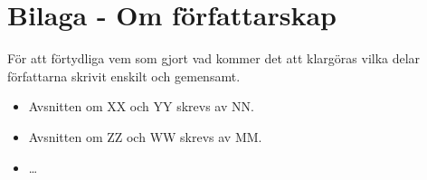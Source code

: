 \section{Bilaga - Om författarskap}
För att förtydliga vem som gjort vad kommer det att klargöras vilka delar
författarna skrivit enskilt och gemensamt.

\begin{itemize}
  \item Avsnitten om XX och YY skrevs av NN.
  \item Avsnitten om ZZ och WW skrevs av MM.
  \item \ldots
\end{itemize}

